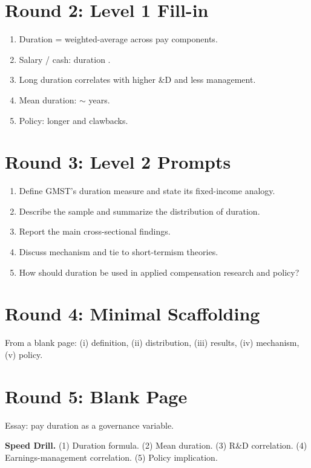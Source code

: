 \documentclass[11pt]{article}
\newcommand{\blank}[1]{\underline{\hspace{#1}}}
\begin{document}
\section*{Round 2: Level 1 Fill-in}
\begin{enumerate}
\item Duration = weighted-average \blank{2cm} across pay components.
\item Salary / cash: duration \blank{1cm}.
\item Long duration correlates with higher \blank{1cm}\&D and less \blank{2cm} management.
\item Mean duration: $\sim$\blank{1cm} years.
\item Policy: longer \blank{2cm} and clawbacks.
\end{enumerate}

\section*{Round 3: Level 2 Prompts}
\begin{enumerate}
\item Define GMST's duration measure and state its fixed-income analogy.
\item Describe the sample and summarize the distribution of duration.
\item Report the main cross-sectional findings.
\item Discuss mechanism and tie to short-termism theories.
\item How should duration be used in applied compensation research and policy?
\end{enumerate}

\section*{Round 4: Minimal Scaffolding}
From a blank page: (i) definition, (ii) distribution, (iii) results, (iv) mechanism, (v) policy.

\section*{Round 5: Blank Page}
Essay: pay duration as a governance variable.

\vspace{6pt}
\begin{drillbox}
\textbf{Speed Drill.} (1) Duration formula. (2) Mean duration. (3) R\&D correlation. (4) Earnings-management correlation. (5) Policy implication.
\end{drillbox}
\end{document}
